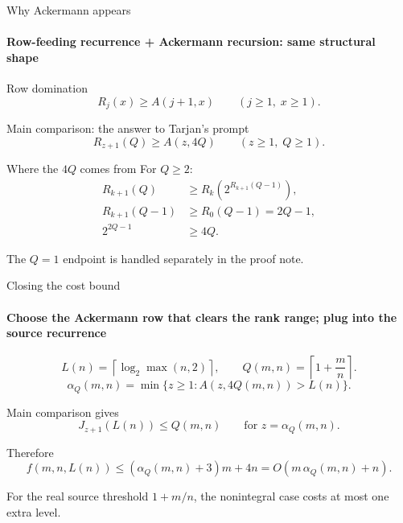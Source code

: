 \documentclass[aspectratio=169,11pt]{beamer}
\newcommand{\source}[1]{{\scriptsize\color{darkgray}#1}}
\begin{document}
\begin{frame}{Why Ackermann appears}
\framesubtitle{Row-feeding recurrence + Ackermann recursion: same structural shape}
\begin{block}{Row domination}
\[
  R_j(x) \ge A(j+1,x)
  \qquad (j\ge 1,\; x\ge 1).
\]
\end{block}

\begin{block}{Main comparison: the answer to Tarjan's prompt}
\[
  R_{z+1}(Q) \ge A(z,4Q)
  \qquad (z\ge 1,\; Q\ge 1).
\]
\end{block}

\begin{block}{Where the $4Q$ comes from}
For $Q\ge 2$:
\[
\begin{aligned}
R_{k+1}(Q) &\ge R_k\!\left(2^{R_{k+1}(Q-1)}\right),\\
R_{k+1}(Q-1) &\ge R_0(Q-1)=2Q-1,\\
2^{2Q-1} &\ge 4Q.
\end{aligned}
\]
\end{block}
\source{The $Q=1$ endpoint is handled separately in the proof note.}
\end{frame}

\begin{frame}{Closing the cost bound}
\framesubtitle{Choose the Ackermann row that clears the rank range; plug into the source recurrence}
\[
  L(n)=\left\lceil\log_2\max(n,2)\right\rceil,
  \qquad
  Q(m,n)=\left\lceil 1+\frac{m}{n}\right\rceil.
\]
\[
  \alpha_Q(m,n)=\min\{z\ge 1: A(z,4Q(m,n))>L(n)\}.
\]

\begin{block}{Main comparison gives}
\[
  J_{z+1}(L(n))\le Q(m,n)
  \qquad\text{for }z=\alpha_Q(m,n).
\]
\end{block}

\begin{block}{Therefore}
\[
  f(m,n,L(n))\le (\alpha_Q(m,n)+3)m+4n
  =O\!\left(m\,\alpha_Q(m,n)+n\right).
\]
\end{block}
\source{For the real source threshold $1+m/n$, the nonintegral case costs at most one extra level.}
\end{frame}
\end{document}
